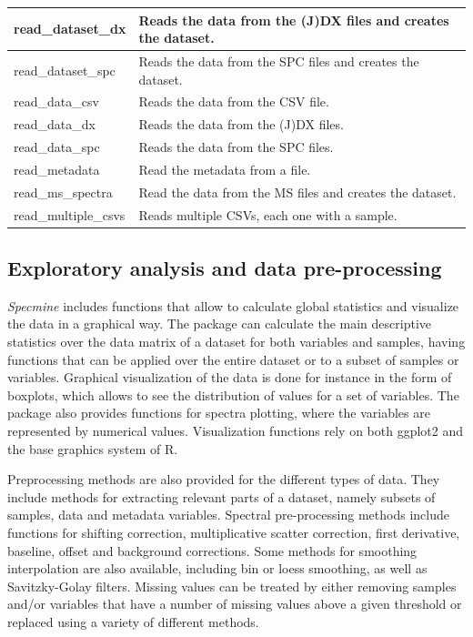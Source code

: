 \begin{scriptsize}
\begin{longtable}{|m{4.3cm}|m{10cm}|}
		\hline
		read\_dataset\_dx & Reads the data from the (J)DX files and creates the dataset. \\
		
		\hline
		read\_dataset\_spc & Reads the data from the SPC files and creates the dataset. \\
		
		\hline
		read\_data\_csv & Reads the data from the CSV file. \\
		
		\hline
		read\_data\_dx & Reads the data from the (J)DX files. \\
		
		\hline
		read\_data\_spc & Reads the data from the SPC files. \\
		
		\hline
		read\_metadata & Read the metadata from a file. \\
		
		\hline
		read\_ms\_spectra & Read the data from the MS files and creates the dataset. \\
		
		\hline
		read\_multiple\_csvs & Reads multiple CSVs, each one with a sample. \\
		
		\hline
		
	\end{longtable}
\end{scriptsize}

\subsection{Exploratory analysis and data pre-processing}

\textit{Specmine} includes functions that allow to calculate global statistics and visualize the data in a graphical way. The package can calculate the main descriptive statistics over the data matrix of a dataset for both variables and samples, having functions that can be applied over the entire dataset or to a subset of samples or variables. Graphical visualization of the data is done for instance in the form of boxplots, which allows to see the distribution of values for a set of variables. The package also provides functions for spectra plotting, where the variables are represented by numerical values. Visualization functions rely on both ggplot2 and the base graphics system of R.

Preprocessing methods are also provided for the different types of data. They include methods for extracting relevant parts of a dataset, namely subsets of samples, data and metadata variables. Spectral pre-processing methods include functions for shifting correction, multiplicative scatter correction, first derivative, baseline, offset and background corrections. Some methods for smoothing interpolation are also available, including bin or loess smoothing, as well as Savitzky-Golay filters. Missing values can be treated by either removing samples and/or variables that have a number of missing values above a given threshold or replaced using a variety of different methods. 

